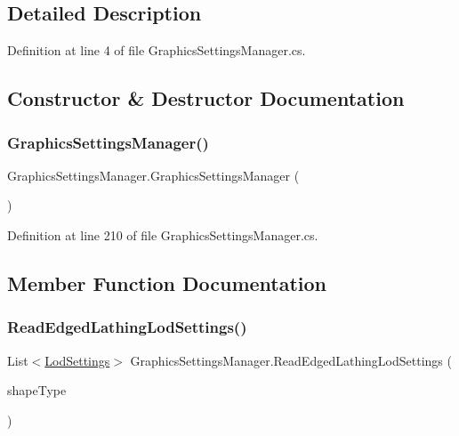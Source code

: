 \subsection{Detailed Description}


Definition at line 4 of file Graphics\+Settings\+Manager.\+cs.



\subsection{Constructor \& Destructor Documentation}
\mbox{\label{class_graphics_settings_manager_a4d02f60a64880fa16f2aaf4000cbbfe9}} 
\subsubsection{\texorpdfstring{GraphicsSettingsManager()}{GraphicsSettingsManager()}}
{\footnotesize\ttfamily Graphics\+Settings\+Manager.\+Graphics\+Settings\+Manager (\begin{DoxyParamCaption}{ }\end{DoxyParamCaption})}



Definition at line 210 of file Graphics\+Settings\+Manager.\+cs.



\subsection{Member Function Documentation}
\mbox{\label{class_graphics_settings_manager_a9492feedb687bce9bf90ac72ecd81188}} 
\subsubsection{\texorpdfstring{ReadEdgedLathingLodSettings()}{ReadEdgedLathingLodSettings()}}
{\footnotesize\ttfamily List$<$\mbox{\hyperlink{class_lod_settings}{Lod\+Settings}}$>$ Graphics\+Settings\+Manager.\+Read\+Edged\+Lathing\+Lod\+Settings (\begin{DoxyParamCaption}\item[{\mbox{\hyperlink{_shape_types_8cs_af0e24915ca1b4c216da56b86a5f3de13}{Shape\+Types}}}]{shape\+Type }\end{DoxyParamCaption})}



